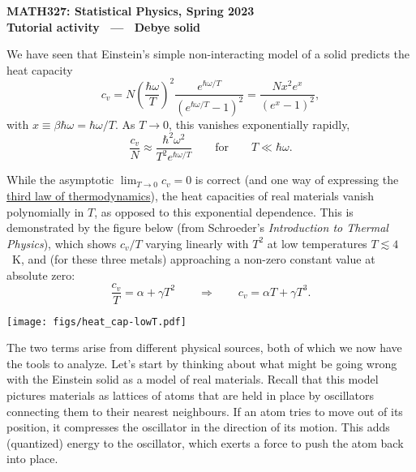 \documentclass[12 pt]{article} %
\newcommand{\al}{\ensuremath{\alpha} }
\newcommand{\be}{\ensuremath{\beta} }
\newcommand{\ga}{\ensuremath{\gamma} }
\newcommand{\om}{\ensuremath{\omega} }
\newcommand{\Lra}{\ensuremath{\Longrightarrow} }
\begin{document}
\newcommand{\thisunit}{MATH327 Tutorial (Debye)}
\newcommand{\moddate}{Last modified 27 Apr.~2023}
\begin{center}
  {\Large \textbf{MATH327: Statistical Physics, Spring 2023}} \\[12 pt]
  {\Large \textbf{Tutorial activity \ --- \ Debye solid}} \\[24 pt]
\end{center}

We have seen that Einstein's simple non-interacting model of a solid predicts the heat capacity
\begin{equation*}
  c_v = N \left(\frac{\hbar \om}{T}\right)^2 \frac{e^{\hbar \om / T}}{\left(e^{\hbar \om / T} - 1\right)^2} = \frac{N x^2 e^x}{\left(e^x - 1\right)^2},
\end{equation*}
with $x \equiv \be\hbar\om = \hbar\om / T$.
As $T \to 0$, this vanishes exponentially rapidly,
\begin{equation*}
  \frac{c_v}{N} \approx \frac{\hbar^2 \om^2}{T^2 e^{\hbar \om / T}} \qquad \mbox{for} \qquad T \ll \hbar\om.
\end{equation*}

While the asymptotic $\lim_{T \to 0} c_v = 0$ is correct (and one way of expressing the \href{https://en.wikipedia.org/wiki/Third_law_of_thermodynamics#Specific_heat}{third law of thermodynamics}), the heat capacities of real materials vanish polynomially in $T$, as opposed to this exponential dependence.
This is demonstrated by the figure below (from Schroeder's \textit{Introduction to Thermal Physics}), which shows $c_v / T$ varying linearly with $T^2$ at low temperatures $T \lesssim 4$~K, and (for these three metals) approaching a non-zero constant value at absolute zero:
\begin{equation*}
  \frac{c_v}{T} = \al + \ga T^2 \qquad \Lra \qquad c_v = \al T + \ga T^3.
\end{equation*}

\begin{center}\texttt{[image: figs/heat\_cap-lowT.pdf]}\end{center}

The two terms arise from different physical sources, both of which we now have the tools to analyze.
Let's start by thinking about what might be going wrong with the Einstein solid as a model of real materials.
Recall that this model pictures materials as lattices of atoms that are held in place by oscillators connecting them to their nearest neighbours.
If an atom tries to move out of its position, it compresses the oscillator in the direction of its motion.
This adds (quantized) energy to the oscillator, which exerts a force to push the atom back into place.
\end{document}
